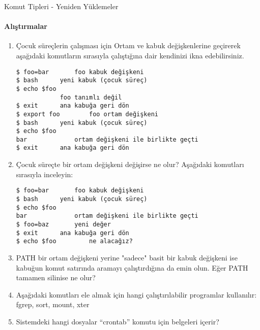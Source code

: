 \begin{section}{Komut Tipleri - Yeniden Yüklemeler}
\paragraph{{\Huge{\PencilLeftDown}}Alıştırmalar}{
\begin{enumerate}
\item Çocuk süreçlerin çalışması için Ortam ve kabuk değişkenlerine geçirerek aşağıdaki komutların sırasıyla çalıştığına dair kendinizi ikna edebilirsiniz.
\begin{verbatim}
$ foo=bar 		foo kabuk değişkeni
$ bash 		yeni kabuk (çocuk süreç)
$ echo $foo
			foo tanımlı değil
$ exit 		ana kabuğa geri dön
$ export foo 		foo ortam değişkeni
$ bash 		yeni kabuk (çocuk süreç)
$ echo $foo
bar 			ortam değişkeni ile birlikte geçti
$ exit 		ana kabuğa geri dön
\end{verbatim}
\item Çocuk süreçte bir ortam değişkeni değişirse ne olur? Aşağıdaki komutları sırasıyla inceleyin:
\begin{verbatim}
$ foo=bar 		foo kabuk değişkeni
$ bash 		yeni kabuk (çocuk süreç)
$ echo $foo
bar 			ortam değişkeni ile birlikte geçti
$ foo=baz 		yeni değer
$ exit 		ana kabuğa geri dön
$ echo $foo 		ne alacağız?
\end{verbatim}
\item PATH bir ortam değişkeni yerine "sadece" basit bir kabuk değişkeni ise kabuğun komut satırında aramayı çalıştırdığına da emin olun. Eğer PATH tamamen silinise ne olur?
\item Aşağıdaki komutları ele almak için hangi çalıştırılabilir programlar kullanılır: fgrep, sort, mount, xter
\item Sistemdeki hangi dosyalar “crontab” komutu için belgeleri içerir?
\end{enumerate}}
\end{section}

